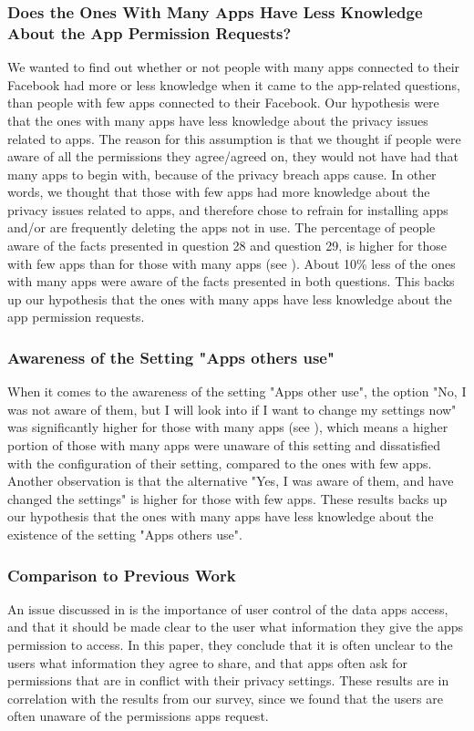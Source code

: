 \subsubsection{Does the Ones With Many Apps Have Less Knowledge About the App Permission Requests?}
We wanted to find out whether or not people with many apps connected to their Facebook had more or less knowledge when it came to the app-related questions, than people with few apps connected to their Facebook. Our hypothesis were that the ones with many apps have less knowledge about the privacy issues related to apps. The reason for this assumption is that we thought if people were aware of all the permissions they agree/agreed on, they would not have had that many apps to begin with, because of the privacy breach apps cause. In other words, we thought that those with few apps had more knowledge about the privacy issues related to apps, and therefore chose to refrain for installing apps and/or are frequently deleting the apps not in use. The percentage of people aware of the facts presented in question 28 and question 29, is higher for those with few apps than for those with many apps (see ). About 10\% less of the ones with many apps were aware of the facts presented in both questions. This backs up our hypothesis that the ones with many apps have less knowledge about the app permission requests. 

\subsubsection{Awareness of the Setting "Apps others use"}
When it comes to the awareness of the setting "Apps other use", the option "No, I was not aware of them, but I will look into if I want to change my settings now" was significantly higher for those with many apps (see ), which means a higher portion of those with many apps were unaware of this setting and dissatisfied with the configuration of their setting, compared to the ones with few apps. Another observation is that the alternative "Yes, I was aware of them, and have changed the settings" is higher for those with few apps. These results backs up our hypothesis that the ones with many apps have less knowledge about the existence of the setting "Apps others use". 

\subsubsection{Comparison to Previous Work}
An issue discussed in \cite{thirdPartyApps} is the importance of user control of the data apps access, and that it should be made clear to the user what information they give the apps permission to access. In this paper, they conclude that it is often unclear to the users what information they agree to share, and that apps often ask for permissions that are in conflict with their privacy settings. These results are in correlation with the results from our survey, since we found that the users are often unaware of the permissions apps request. 


